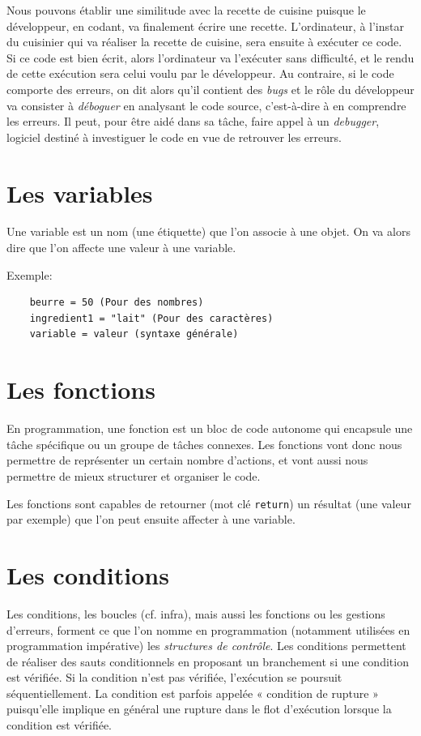 \documentclass[a4paper,12pt]{book}
\begin{document}
Nous pouvons établir une similitude avec la recette de cuisine puisque le développeur, en codant, va finalement écrire une recette. L'ordinateur, à l'instar du cuisinier qui va réaliser la recette de cuisine, sera ensuite à exécuter ce code. Si ce code est bien écrit, alors l'ordinateur va l'exécuter sans difficulté, et le rendu de cette exécution sera celui voulu par le développeur. Au contraire, si le code comporte des erreurs, on dit alors qu'il contient des \textit{bugs} et le rôle du développeur va consister à \textit{déboguer} en analysant le code source, c'est-à-dire à en comprendre les erreurs. Il peut, pour être aidé dans sa tâche, faire appel à un \textit{debugger}, logiciel destiné à investiguer le code en vue de retrouver les erreurs.
\medskip

\section{Les variables}
Une variable est un nom (une étiquette) que l'on associe à une objet. On va alors dire que l'on affecte une valeur à une variable.
\medskip

Exemple:
\begin{verbatim}
    beurre = 50 (Pour des nombres)
    ingredient1 = "lait" (Pour des caractères)
    variable = valeur (syntaxe générale)
\end{verbatim}
\medskip

\section{Les fonctions}
En programmation, une fonction est un bloc de code autonome qui encapsule une tâche spécifique ou un groupe de tâches connexes. Les fonctions vont donc nous permettre de représenter un certain nombre d'actions, et vont aussi nous permettre de mieux structurer et organiser le code.
\medskip

Les fonctions sont capables de retourner (mot clé \texttt{return}) un résultat (une valeur par exemple) que l'on peut ensuite affecter à une variable.
\medskip

\section{Les conditions}
Les conditions, les boucles (cf. infra), mais aussi les fonctions ou les gestions d'erreurs, forment ce que l'on nomme en programmation (notamment utilisées en programmation impérative) les \textit{structures de contrôle}. Les conditions permettent de réaliser des sauts conditionnels en proposant un branchement si une condition est vérifiée. Si la condition n'est pas vérifiée, l'exécution se poursuit séquentiellement. La condition est parfois appelée « condition de rupture » puisqu'elle implique en général une rupture dans le flot d'exécution lorsque la condition est vérifiée. 
\medskip
\end{document}
